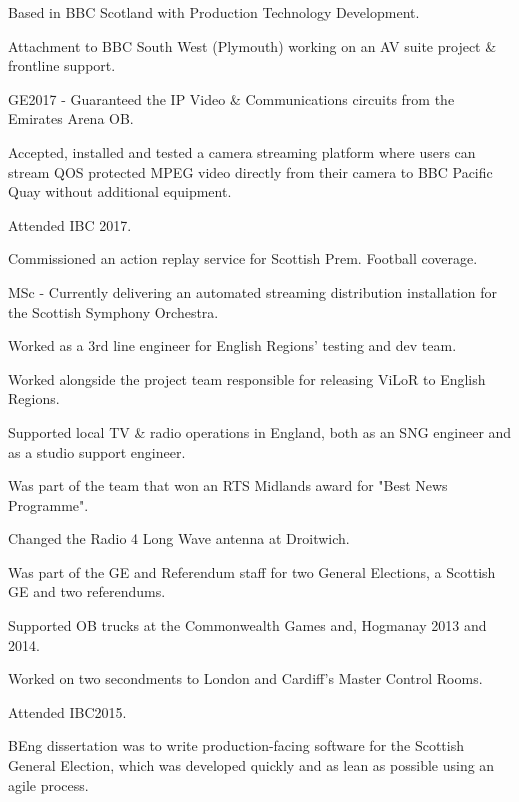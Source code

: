 \documentclass[]{deedy-resume-openfont}
\begin{document}
\begin{minipage}[t]{0.66\textwidth}
\vspace{\topsep} %
\begin{tightemize}
\item Based in BBC Scotland with Production Technology Development.
\item Attachment to BBC South West (Plymouth) working on an AV suite project \& frontline support.
\item GE2017 - Guaranteed the IP Video \& Communications circuits from the Emirates Arena OB.
\item Accepted, installed and tested a camera streaming platform where users can stream QOS protected MPEG video directly from their camera to BBC Pacific Quay without additional equipment.
\item Attended IBC 2017.
\item Commissioned an action replay service for Scottish Prem. Football coverage.
\item MSc - Currently delivering an automated streaming distribution installation for the Scottish Symphony Orchestra.
\end{tightemize}
\sectionsep

\begin{tightemize}
\item Worked as a 3rd line engineer for English Regions' testing and dev team.
\item Worked alongside the project team responsible for releasing ViLoR to English Regions.
\item Supported local TV \& radio operations in England, both as an SNG engineer and as a studio support engineer.
\item Was part of the team that won an RTS Midlands award for "Best News Programme".
\item Changed the Radio 4 Long Wave antenna at Droitwich.
\item Was part of the GE and Referendum staff for two General Elections, a Scottish GE and two referendums.
\item Supported OB trucks at the Commonwealth Games and, Hogmanay 2013 and 2014.
\item Worked on two secondments to London and Cardiff's Master Control Rooms.
\item Attended IBC2015.
\item BEng dissertation was to write production-facing software for the Scottish General Election, which was developed quickly and as lean as possible using an agile process.
\end{tightemize}
\sectionsep


\end{minipage}
\end{document}
